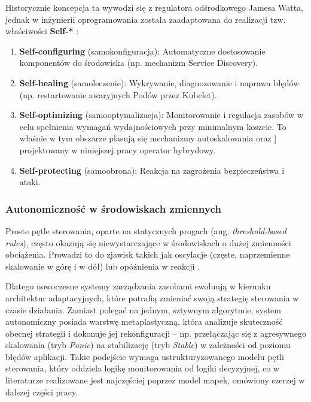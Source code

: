 Historycznie koncepcja ta wywodzi się z regulatora odśrodkowego Jamesa Watta, jednak w inżynierii oprogramowania została 
zaadaptowana do realizacji tzw. właściwości \textbf{Self-*} \cite{salehie2009self}:
\begin{enumerate}
    \item \textbf{Self-configuring} (samokonfiguracja): Automatyczne dostosowanie komponentów do środowiska (np. mechanizm 
      Service Discovery).
    \item \textbf{Self-healing} (samoleczenie): Wykrywanie, diagnozowanie i naprawa błędów (np. restartowanie awaryjnych 
      Podów przez Kubelet).
    \item \textbf{Self-optimizing} (samooptymalizacja): Monitorowanie i regulacja zasobów w celu spełnienia wymagań 
      wydajnościowych przy minimalnym koszcie. To właśnie w tym obszarze plasują się mechanizmy autoskalowania oraz ]
      projektowany w niniejszej pracy operator hybrydowy.
    \item \textbf{Self-protecting} (samoobrona): Reakcja na zagrożenia bezpieczeństwa i ataki.
\end{enumerate}

\subsubsection{Autonomiczność w środowiskach zmiennych}

Proste pętle sterowania, oparte na statycznych progach (ang. \textit{threshold-based rules}), często okazują się 
niewystarczające w środowiskach o dużej zmienności obciążenia. Prowadzi to do zjawisk takich jak oscylacje (częste, 
naprzemienne skalowanie w górę i w dół) lub opóźnienia w reakcji \cite{al2017elasticity}.

Dlatego nowoczesne systemy zarządzania zasobami ewoluują w kierunku architektur adaptacyjnych, które potrafią zmieniać swoją 
strategię sterowania w czasie działania. Zamiast polegać na jednym, sztywnym algorytmie, system autonomiczny posiada warstwę 
metaplastyczną, która analizuje skuteczność obecnej strategii i dokonuje jej rekonfiguracji – np. przełączając się z agresywnego 
skalowania (tryb \textit{Panic}) na stabilizację (tryb \textit{Stable}) w zależności od poziomu błędów aplikacji.
Takie podejście wymaga ustrukturyzowanego modelu pętli sterowania, który oddziela logikę monitorowania od logiki decyzyjnej, 
co w literaturze realizowane jest najczęściej poprzez model \gls{mapek}, omówiony szerzej w dalszej części pracy.

